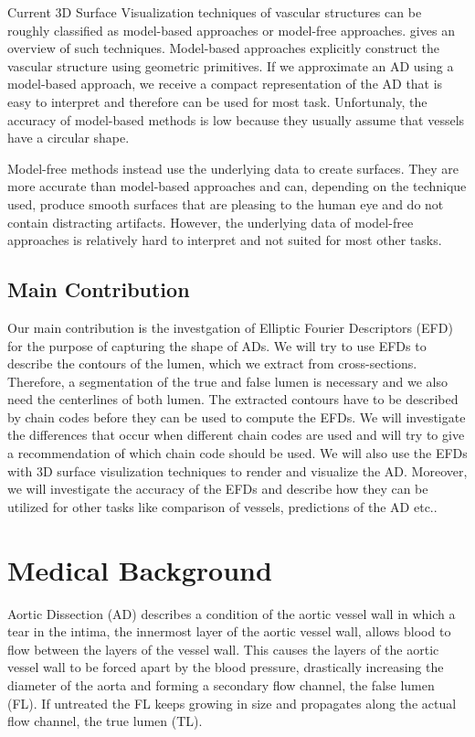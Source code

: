 \documentclass[thesis.tex]{subfiles}
\begin{document}
Current 3D Surface Visualization techniques of vascular structures can be roughly classified as model-based approaches or model-free approaches. \cite{preim20083d} gives an overview of such techniques. Model-based approaches explicitly construct the vascular structure using geometric primitives. If we approximate an AD using a model-based approach, we receive a compact representation of the AD that is easy to interpret and therefore can be used for most task. Unfortunaly, the accuracy of model-based methods is low because they usually assume that vessels have a circular shape.  

Model-free methods instead use the underlying data to create surfaces. They are more accurate than model-based approaches and can, depending on the technique used, produce smooth surfaces that are pleasing to the human eye and do not contain distracting artifacts. However, the underlying data of model-free approaches is relatively hard to interpret and not suited for most other tasks. 

\section{Main Contribution}

Our main contribution is the investgation of Elliptic Fourier Descriptors (EFD) for the purpose of capturing the shape of ADs. We will try to use EFDs to describe the contours of the lumen, which we extract from cross-sections. Therefore, a segmentation of the true and false lumen is necessary and we also need the centerlines of both lumen. The extracted contours have to be described by chain codes before they can be used to compute the EFDs. We will investigate the differences that occur when different chain codes are used and will try to give a recommendation of which chain code should be used. We will also use the EFDs with 3D surface visulization techniques to render and visualize the AD. Moreover, we will investigate the accuracy of the EFDs and describe how they can be utilized for other tasks like comparison of vessels, predictions of the AD etc..

\chapter{Medical Background}

Aortic Dissection (AD) describes a condition of the aortic vessel wall in which a tear in the intima, the innermost layer of the aortic vessel wall, allows blood to flow between the layers of the vessel wall. This causes the layers of the aortic vessel wall to be forced apart by the blood pressure, drastically increasing the diameter of the aorta and forming a secondary flow channel, the false lumen (FL). If untreated the FL keeps growing in size and propagates along the actual flow channel, the true lumen (TL).
\end{document}

